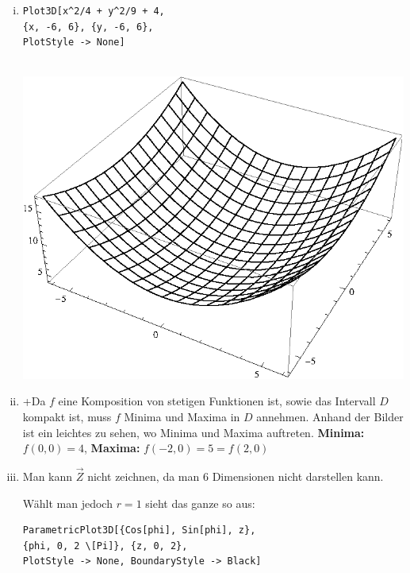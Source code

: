 \documentclass[10pt,a4paper]{scrartcl}
\begin{document}
\begin{enumerate}[(i)]
\begin{minipage}{0.49\columnwidth}
\end{minipage}
\item 
\begin{minipage}{0.50\columnwidth}
\begin{lstlisting}[caption= Mathematica Code für den Graph von h]
Plot3D[x^2/4 + y^2/9 + 4, 
{x, -6, 6}, {y, -6, 6},
PlotStyle -> None]
\end{lstlisting}
\end{minipage}
\begin{minipage}{0.50\columnwidth}
$\qquad$\includegraphics[scale=0.7]{1ii.eps} 
\end{minipage}
\item 
+Da $f$ eine Komposition von stetigen Funktionen ist, sowie das Intervall $D$ kompakt ist, muss $f$ Minima und Maxima in $D$ annehmen. Anhand der Bilder ist ein leichtes zu sehen, wo Minima und Maxima auftreten. \textbf{Minima: } $f(0,0) = 4$, \textbf{Maxima: } %
$f(-2,0) = 5 = f(2,0)$
\item 
Man kann $\vec{Z}$ nicht zeichnen, da man 6 Dimensionen nicht darstellen kann.  \\
\begin{minipage}{0.49\columnwidth}
Wählt man jedoch $r=1$ sieht das ganze so aus:
\begin{lstlisting}[caption= Mathematica Code für den Graph von Z]
ParametricPlot3D[{Cos[phi], Sin[phi], z}, 
{phi, 0, 2 \[Pi]}, {z, 0, 2}, 
PlotStyle -> None, BoundaryStyle -> Black]
\end{lstlisting}
\end{minipage}

\end{enumerate}
\end{document}
